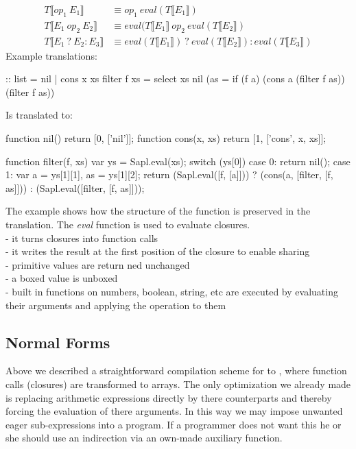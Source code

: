 \begin{align*}
T \llbracket op_1 \: E_1 \rrbracket &
        \equiv op_1 \: eval(T \llbracket E_1 \rrbracket) \\
T \llbracket E_1 \: op_2 \: E_2 \rrbracket &
        \equiv eval(T \llbracket E_1 \rrbracket \: op_2 \: eval(T \llbracket E_2 \rrbracket) \\
T \llbracket E_1 \: ? \: E_2 : E_3 \rrbracket &
        \equiv eval(T \llbracket E_1 \rrbracket) \: ? \: eval(T \llbracket E_2 \rrbracket) : eval(T \llbracket E_3 \rrbracket)
\end{align*}
%
Example translations:
\begin{CleanCode}
:: list = nil | cons x xs	
filter f xs = select xs nil (\a as = if (f a) (cons a (filter f as)) (filter f as))
\end{CleanCode}
%
Is translated to:
\begin{CleanCode}
function nil() {return [0, ['nil']];}
function cons(x, xs) {return [1, ['cons', x, xs]];}

function filter(f, xs) {
    var ys = Sapl.eval(xs);
    switch (ys[0]) {
    case 0:
        return nil();
    case 1:
        var a = ys[1][1],
            as = ys[1][2];
        return (Sapl.eval([f, [a]])) ? (cons(a, [filter, [f, as]])) : 
                                       (Sapl.eval([filter, [f, as]]));
    }
}\end{CleanCode}
The example shows how the structure of the function is preserved in the translation.
The \emph{eval} function is used to evaluate closures.\\
- it turns closures into function calls\\
- it writes the result at the first position of the closure to enable sharing\\
- primitive values are return ned unchanged\\
- a boxed value is unboxed\\
- built in functions on numbers, boolean, string, etc are executed by evaluating their arguments and applying the operation to them

\subsection{Normal Forms}
Above we described a straightforward compilation scheme for \Sapl to \JS, where function calls (closures) are transformed to arrays.
The only optimization we already made is replacing arithmetic expressions directly by there \JS counterparts 
and thereby forcing the evaluation of there arguments. 
In this way we may impose unwanted eager sub-expressions into a program. 
If a programmer does not want this he or she should use an indirection via an own-made auxiliary function.

